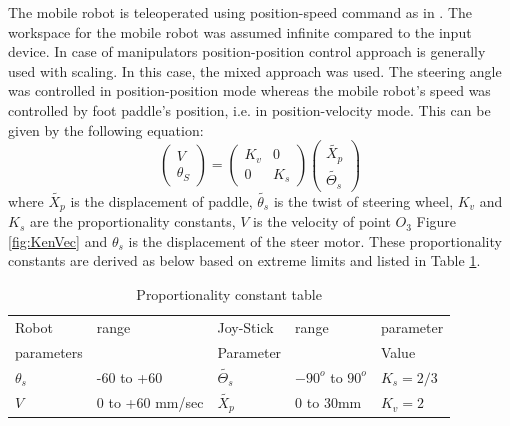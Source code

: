 The mobile robot is teleoperated using position-speed command as in \cite{farkhatdinov2007hybrid}.  The workspace for the mobile robot was assumed  infinite compared to the input device. In case of manipulators position-position control approach is generally used with scaling. In this case,  the mixed approach was used. The steering angle was controlled in position-position mode whereas the mobile robot's speed was controlled by foot paddle's position, i.e. in  position-velocity mode. This can be given by the following equation: 
\begin{equation}
	\begin{pmatrix}
	V\\\theta_S
	\end{pmatrix}=
	\begin{pmatrix}
	K_v & 0\\0 & K_s
	\end{pmatrix}
	\begin{pmatrix}
	\tilde{X_p}\\
	\tilde{\Theta_s}
	\end{pmatrix}
\end{equation}
where $\tilde{X_p}$ is the displacement of  paddle, $\tilde{\theta_s}$ is the twist of steering wheel, $K_v$ and $K_s$ are the proportionality constants, $V$ is the velocity of point $O_3$  Figure \ref{fig:KenVec} and $\theta_s$ is the displacement of the steer motor. These proportionality constants are derived as below based on extreme limits and  listed in Table \ref{tbl:propCnst}. 

\begin{table}[!htbp]
	\caption{Proportionality constant table} 
	\label{tbl:propCnst}
	\centering
	\begin{tabular}{l l l l l}
		\hline
		Robot  & range & Joy-Stick& range & parameter \\
		parameters& & Parameter & & Value\\
		\hline
		$\theta_s$ & -60 to +60 & $\tilde{\Theta_s}$ & $-90^o$ to $90^o$ & $K_s=2/3$\\
		$V$ & 0 to +60 mm/sec & $\tilde{X_p}$ & 0 to 30mm & $K_v=2$\\
		\hline
	\end{tabular}	
\end{table}


